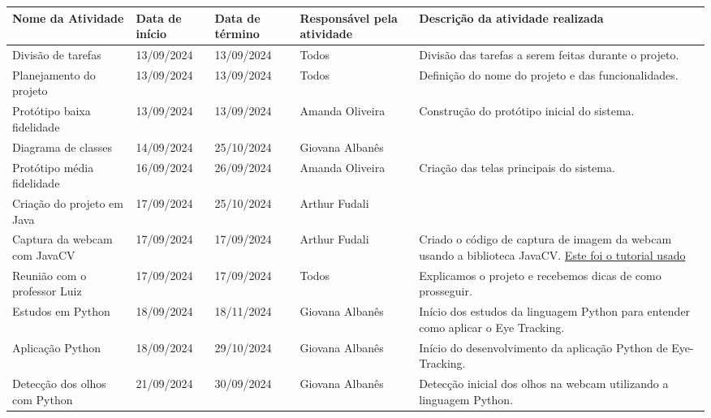 \documentclass[
landscape,
  a4paper,%
  12pt,%
  english,%
  brazilian,%
]{article}
\begin{document}
\begin{table}[]
\begin{tabular}{|l|l|l|p{5cm}|p{8cm}|}
\hline
Nome da Atividade                     & Data de início  & Data de término & Responsável pela atividade  & Descrição da atividade realizada \\ \hline
Divisão de tarefas                    & 13/09/2024      & 13/09/2024      & Todos                       & Divisão das tarefas a serem feitas durante o projeto.\\ \hline
Planejamento do projeto               & 13/09/2024      & 13/09/2024      & Todos                       & Definição do nome do projeto e das funcionalidades.\\ \hline
Protótipo baixa fidelidade            & 13/09/2024      & 13/09/2024      & Amanda Oliveira             & Construção do protótipo inicial do sistema.\\ \hline
Diagrama de classes                   & 14/09/2024      & 25/10/2024      & Giovana Albanês             & \\ \hline
Protótipo média fidelidade            & 16/09/2024      & 26/09/2024      & Amanda Oliveira             & Criação das telas principais do sistema.\\ \hline
Criação do projeto em Java            & 17/09/2024      & 25/10/2024      & Arthur Fudali               & \\ \hline
Captura da webcam com JavaCV          & 17/09/2024      & 17/09/2024      & Arthur Fudali               & Criado o código de captura de imagem da webcam usando a biblioteca JavaCV. \href{https://www.youtube.com/watch?v=NUQc7-dYIxA&t}{Este foi o tutorial usado} \\ \hline
Reunião com o professor Luiz          & 17/09/2024      & 17/09/2024      & Todos                       & Explicamos o projeto e recebemos dicas de como prosseguir. \\ \hline
Estudos em Python                     & 18/09/2024      & 18/11/2024      & Giovana Albanês             & Início dos estudos da linguagem Python para entender como aplicar o Eye Tracking. \\ \hline
Aplicação Python                      & 18/09/2024      & 29/10/2024      & Giovana Albanês             & Início do desenvolvimento da aplicação Python de Eye-Tracking. \\ \hline
Detecção dos olhos com Python         & 21/09/2024      & 30/09/2024      & Giovana Albanês             & Detecção inicial dos olhos na webcam utilizando a linguagem Python. \\ \hline

\end{tabular}
\end{table}
\end{document}
